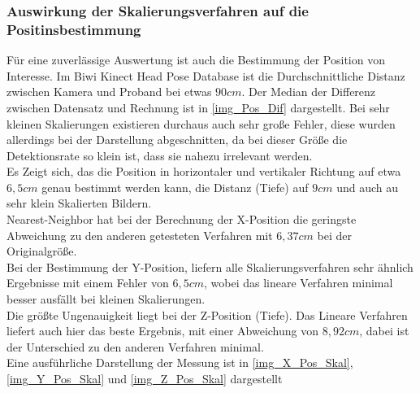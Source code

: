 \subsubsection{Auswirkung der Skalierungsverfahren auf die Positinsbestimmung}
Für eine zuverlässige Auswertung ist auch die Bestimmung der Position von Interesse. Im Biwi Kinect Head Pose Database \cite{BIWI_database} ist die Durchschnittliche Distanz zwischen Kamera und Proband bei etwas $90cm$. Der Median der Differenz zwischen Datensatz und Rechnung ist in \autoref{img_Pos_Dif} dargestellt. Bei sehr kleinen Skalierungen existieren durchaus auch sehr große Fehler, diese wurden allerdings bei der Darstellung abgeschnitten, da bei dieser Größe die Detektionsrate so klein ist, dass sie nahezu irrelevant werden.\\
Es Zeigt sich, das die Position in horizontaler und vertikaler Richtung auf etwa $6,5cm$ genau bestimmt werden kann, die Distanz (Tiefe) auf $9cm$ und auch au sehr klein Skalierten Bildern.\\
Nearest-Neighbor hat bei der Berechnung der X-Position die geringste Abweichung zu den anderen getesteten Verfahren mit $6,37cm$ bei der Originalgröße.\\
Bei der Bestimmung der Y-Position, liefern alle Skalierungsverfahren sehr ähnlich Ergebnisse mit einem Fehler von $6,5cm$, wobei das lineare Verfahren minimal besser ausfällt bei kleinen Skalierungen.\\
Die größte Ungenauigkeit liegt bei der Z-Position (Tiefe). Das Lineare Verfahren liefert auch hier das beste Ergebnis, mit einer Abweichung von $8,92cm$, dabei ist der Unterschied zu den anderen Verfahren minimal.\\
Eine ausführliche Darstellung der Messung ist in \autoref{img_X_Pos_Skal}, \autoref{img_Y_Pos_Skal} und \autoref{img_Z_Pos_Skal} dargestellt
